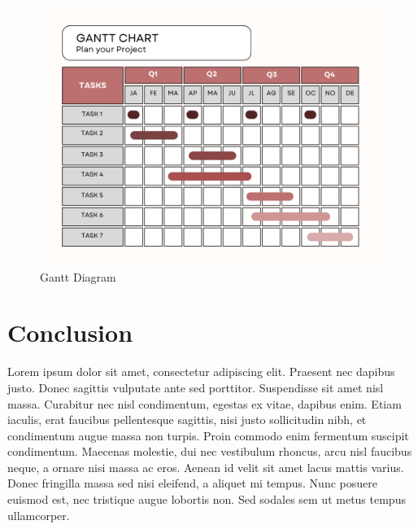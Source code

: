 \begin{figure}[H] 
    \centering
    \includegraphics[width=12cm]{Figures/Gantt_Diagram.png}
    \caption{Gantt Diagram}
\end{figure}

\newpage

\section*{Conclusion}

Lorem ipsum dolor sit amet, consectetur adipiscing elit. Praesent nec dapibus justo. Donec sagittis vulputate ante sed porttitor. Suspendisse sit amet nisl massa. Curabitur nec nisl condimentum, egestas ex vitae, dapibus enim. Etiam iaculis, erat faucibus pellentesque sagittis, nisi justo sollicitudin nibh, et condimentum augue massa non turpis. Proin commodo enim fermentum suscipit condimentum. Maecenas molestie, dui nec vestibulum rhoncus, arcu nisl faucibus neque, a ornare nisi massa ac eros. Aenean id velit sit amet lacus mattis varius. Donec fringilla massa sed nisi eleifend, a aliquet mi tempus. Nunc posuere euismod est, nec tristique augue lobortis non. Sed sodales sem ut metus tempus ullamcorper.

